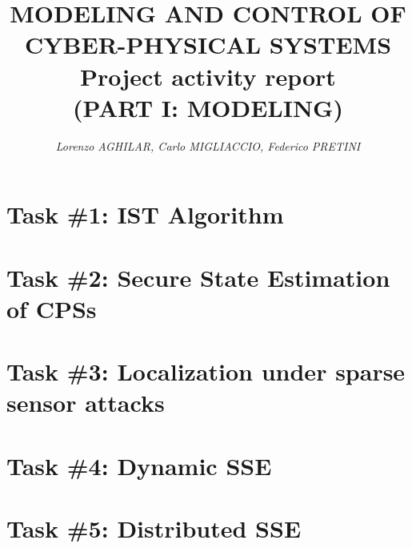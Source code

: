 \documentclass[a4paper, 12pt]{article}
\begin{document}
    
    \title{
        \vspace{-2cm}
        \textbf{
        {\large{MODELING AND CONTROL OF CYBER-PHYSICAL SYSTEMS}}\\
        {\huge{Project activity report }}\\
        \normalsize{(PART I: MODELING)}
        }
    }
    
    \author{
        \textit{    
        Lorenzo AGHILAR,
        Carlo MIGLIACCIO, 
        Federico PRETINI }
    }
    
    \clearpage\maketitle
    \thispagestyle{empty}


    \section*{Task \#1: IST Algorithm}

    \section*{Task \#2: Secure State Estimation of CPSs}

    \section*{Task \#3: Localization under sparse sensor attacks}

    \section*{Task \#4: Dynamic SSE}

    \section*{Task \#5: Distributed SSE}
\end{document}
